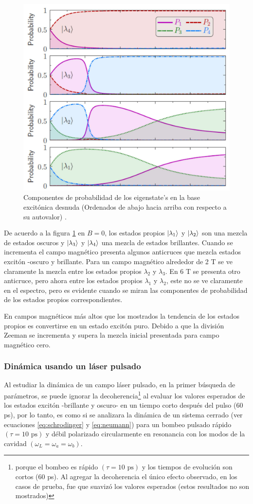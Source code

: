 \documentclass[../main.tex]{subfiles}
\begin{document}
\begin{figure}[th]
	\centering
	\includegraphics[width=0.7\linewidth]{img/FractionalExcitonMagnetic}
	\caption{Componentes de probabilidad de los eigenstate’s en la base excitónica desnuda (Ordenados de abajo hacia arriba con respecto a su autovalor) \parencite{Jimenez2017}.}
	\label{fig:fractionalexcitonmagnetic}
\end{figure}

De acuerdo a la figura \ref{fig:fractionalexcitonmagnetic} en $B=0$, los estados propios $\ket{\lambda_1}$ y $\ket{\lambda_2}$ son una mezcla de estados oscuros y $\ket{\lambda_3}$ y $\ket{\lambda_4}$ una mezcla de estados brillantes. Cuando se incrementa el campo magnético presenta algunos anticruces que mezcla estados excitón -oscuro y brillante. Para un campo magnético alrededor de 2 T se ve claramente la mezcla entre los estados propios $\lambda_2$ y $\lambda_3$. En 6 T se presenta otro anticruce, pero ahora entre los estados propios $\lambda_1$ y $\lambda_2$, este no se ve claramente en el espectro, pero es evidente cuando se miran las componentes de probabilidad de los estados propios correspondientes.

En campos magnéticos más altos que los mostrados la tendencia de los estados propios es convertirse en un estado excitón puro. Debido a que la división Zeeman se incrementa y supera la mezcla inicial presentada para campo magnético cero.

\subsubsection{Dinámica usando un láser pulsado}
Al estudiar la dinámica de un campo láser pulsado, en la primer búsqueda de parámetros, se puede ignorar la decoherencia\footnote{porque el bombeo es rápido $(\tau=10\text{ ps})$ y los tiempos de evolución son cortos (60 ps). Al agregar la decoherencia el único efecto observado, en los casos de prueba, fue que suavizó los valores esperados (estos resultados no son mostrados)} al evaluar los valores esperados de los estados excitón -brillante y oscuro- en un tiempo corto después del pulso (60 ps), por lo tanto, es como si se analizara la dinámica de un sistema cerrado (ver ecuaciones \ref{eq:schrodinger} y \ref{eq:neumann}) para un bombeo pulsado rápido $(\tau=10\text{ ps})$ y débil polarizado circularmente en resonancia con los modos de la cavidad $(\omega_L = \omega_a = \omega_b)$.
\end{document}
